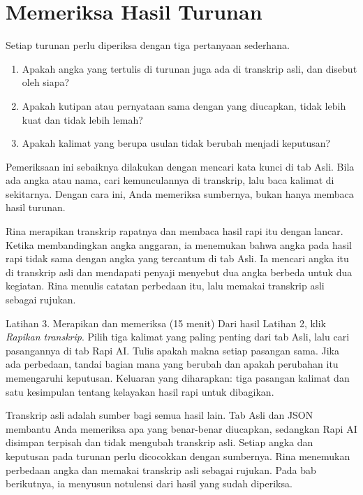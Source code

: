 \section{Memeriksa Hasil Turunan}
Setiap turunan perlu diperiksa dengan tiga pertanyaan sederhana.
\begin{enumerate}
  \item Apakah angka yang tertulis di turunan juga ada di transkrip asli, dan disebut oleh siapa?
  \item Apakah kutipan atau pernyataan sama dengan yang diucapkan, tidak lebih kuat dan tidak lebih lemah?
  \item Apakah kalimat yang berupa usulan tidak berubah menjadi keputusan?
\end{enumerate}

Pemeriksaan ini sebaiknya dilakukan dengan mencari kata kunci di tab Asli. Bila ada angka atau nama, cari kemunculannya di transkrip, lalu baca kalimat di sekitarnya. Dengan cara ini, Anda memeriksa sumbernya, bukan hanya membaca hasil turunan.

\begin{ilustrasi}
Rina merapikan transkrip rapatnya dan membaca hasil rapi itu dengan lancar. Ketika membandingkan angka anggaran, ia menemukan bahwa angka pada hasil rapi tidak sama dengan angka yang tercantum di tab Asli. Ia mencari angka itu di transkrip asli dan mendapati penyaji menyebut dua angka berbeda untuk dua kegiatan. Rina menulis catatan perbedaan itu, lalu memakai transkrip asli sebagai rujukan.
\end{ilustrasi}

\begin{kegiatan}{Latihan 3. Merapikan dan memeriksa (15 menit)}
Dari hasil Latihan 2, klik \emph{Rapikan transkrip}. Pilih tiga kalimat yang paling penting dari tab Asli, lalu cari pasangannya di tab Rapi AI. Tulis apakah makna setiap pasangan sama. Jika ada perbedaan, tandai bagian mana yang berubah dan apakah perubahan itu memengaruhi keputusan. Keluaran yang diharapkan: tiga pasangan kalimat dan satu kesimpulan tentang kelayakan hasil rapi untuk dibagikan.
\end{kegiatan}

\begin{rangkuman}
Transkrip asli adalah sumber bagi semua hasil lain. Tab Asli dan JSON membantu Anda memeriksa apa yang benar-benar diucapkan, sedangkan Rapi AI disimpan terpisah dan tidak mengubah transkrip asli. Setiap angka dan keputusan pada turunan perlu dicocokkan dengan sumbernya. Rina menemukan perbedaan angka dan memakai transkrip asli sebagai rujukan. Pada bab berikutnya, ia menyusun notulensi dari hasil yang sudah diperiksa.
\end{rangkuman}
